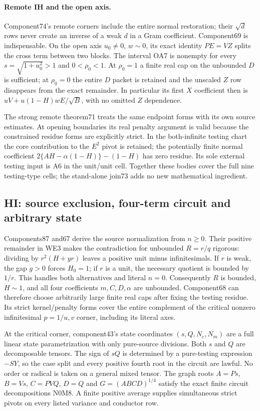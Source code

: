 \paragraph{Remote IH and the open axis.}
Component74's remote corners include the entire normal restoration;
their $\sqrt d$ rows never create an inverse of a weak $d$ in a
Gram coefficient. Component69 is indispensable. On the open axis
$u_0\ne0$, $w\sim0$, its exact identity $PE=VZ$ splits the cross
term between two blocks. The interval OA7 is nonempty for every
$s=\sqrt{1+u_0^2}>1$ and $0<\rho_0<1$. At $\rho_0=1$ a finite
real cap on the unbounded $D$ is sufficient; at $\rho_0=0$ the entire
$D$ packet is retained and the unscaled $Z$ row disappears from the
exact remainder. In particular its first $X$ coefficient then is
$uV+u(1-H)wE/\sqrt B$, with no omitted $Z$ dependence.

The strong remote theorem71 treats the same endpoint forms with
its own source estimates. At opening boundaries its real penalty
argument is valid because the constrained residue forms are explicitly
strict. In the both-infinite testing chart the core contribution to
the $E^2$ pivot is retained; the potentially finite normal coefficient
$2\{AH-\alpha(1-H)\}-(1-H)$ has zero residue. Its sole external
testing input is A6 in the unit/unit cell. Together these bodies cover
the full nine testing-type cells; the stand-alone join73 adds no new
mathematical ingredient.

\subsection{HI: source exclusion, four-term circuit and arbitrary state}

Components87 and67 derive the source normalization from $n\ge0$.
Their positive remainder in WE3 makes the contradiction for unbounded
$R=r/q$ rigorous: dividing by $r^2(H+yr)$ leaves a positive unit
minus infinitesimals. If $r$ is weak, the gap $g>0$ forces $H_0=1$;
if $r$ is a unit, the necessary quotient is bounded by $1/r$.
This handles both alternatives and literal $n=0$.
Consequently $R$ is bounded, $H\sim1$, and all four coefficients
$m,C,D,\alpha$ are unbounded. Component68 can therefore choose
arbitrarily large finite real caps after fixing the testing residue.
Its strict kernel/penalty forms cover the entire complement of the
critical nonzero infinitesimal $p=1/u,v$ corner, including its literal
axes.

At the critical corner, component43's state coordinates
$(s,Q,N_c,N_m)$ are a full linear state parametrization with only
pure-source divisions. Both $s$ and $Q$ are decomposable tensors.
The sign of $sQ$ is determined by a pure-testing expression $-SY$,
so the case split and every positive fourth root in the circuit are
lawful. No order or radical is taken on a general mixed tensor.
The graph roots $A=Ps$, $B=Vs$, $C=PVQ$, $D=Q$ and
$G=(ABCD)^{1/4}$ satisfy the exact finite circuit decompositions
N0M8. A finite positive average supplies simultaneous strict pivots
on every listed variance and conductor row.

